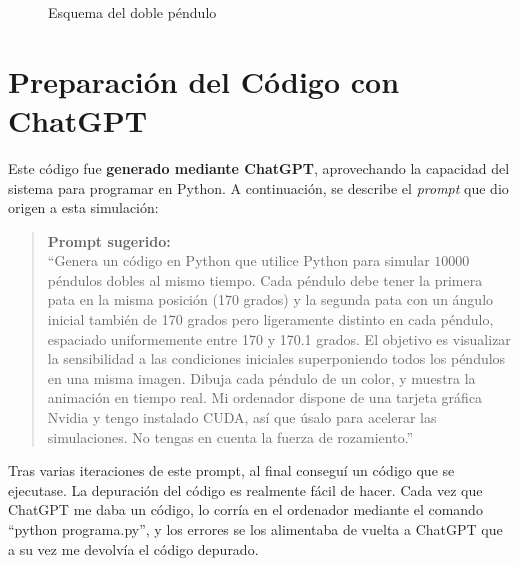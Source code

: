 \documentclass[
  10pt,
  a4paper,
  DIV=11,
  numbers=noendperiod,
  open=any]{scrreprt}
\numberwithin{equation}{chapter}
\numberwithin{equation}{section}
\renewcommand{\[}{\begin{equation}}
\renewcommand{\]}{\end{equation}}
\begin{document}
\begin{figure}[h]
  \centering
  \caption{Esquema del doble péndulo}
\end{figure}



\section{Preparación del Código con
ChatGPT}\label{preparaciuxf3n-del-cuxf3digo-con-chatgpt}

Este código fue \textbf{generado mediante ChatGPT}, aprovechando la
capacidad del sistema para programar en Python. A continuación, se
describe el \emph{prompt} que dio origen a esta simulación:

\begin{quote}
\textbf{Prompt sugerido:}\\
``Genera un código en Python que utilice Python para simular \(10000\)
péndulos dobles al mismo tiempo. Cada péndulo debe tener la primera pata
en la misma posición (170 grados) y la segunda pata con un ángulo
inicial también de 170 grados pero ligeramente distinto en cada péndulo,
espaciado uniformemente entre 170 y 170.1 grados. El objetivo es
visualizar la sensibilidad a las condiciones iniciales superponiendo
todos los péndulos en una misma imagen. Dibuja cada péndulo de un color,
y muestra la animación en tiempo real. Mi ordenador dispone de una
tarjeta gráfica Nvidia y tengo instalado CUDA, así que úsalo para
acelerar las simulaciones. No tengas en cuenta la fuerza de
rozamiento.''
\end{quote}

Tras varias iteraciones de este prompt, al final conseguí un código que
se ejecutase. La depuración del código es realmente fácil de hacer. Cada
vez que ChatGPT me daba un código, lo corría en el ordenador mediante el
comando ``python programa.py'', y los errores se los alimentaba de
vuelta a ChatGPT que a su vez me devolvía el código depurado.
\end{document}
